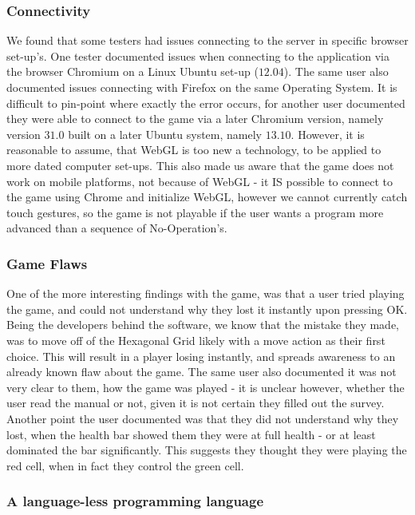\subsubsection{Connectivity}

We found that some testers had issues connecting to the server in specific browser set-up's. One tester documented issues when connecting to the application via the browser Chromium on a Linux Ubuntu set-up ($12.04$). The same user also documented issues connecting with Firefox on the same Operating System. It is difficult to pin-point where exactly the error occurs, for another user documented they were able to connect to the game via a later Chromium version, namely version $31.0$ built on a later Ubuntu system, namely $13.10$. However, it is reasonable to assume, that WebGL is too new a technology, to be applied to more dated computer set-ups. This also made us aware that the game does not work on mobile platforms, not because of WebGL - it IS possible to connect to the game using Chrome and initialize WebGL, however we cannot currently catch touch gestures, so the game is not playable if the user wants a program more advanced than a sequence of No-Operation's.

\subsubsection{Game Flaws}

One of the more interesting findings with the game, was that a user tried playing the game, and could not understand why they lost it instantly upon pressing OK. Being the developers behind the software, we know that the mistake they made, was to move off of the Hexagonal Grid likely with a move action as their first choice. This will result in a player losing instantly, and spreads awareness to an already known flaw about the game. The same user also documented it was not very clear to them, how the game was played - it is unclear however, whether the user read the manual or not, given it is not certain they filled out the survey. Another point the user documented was that they did not understand why they lost, when the health bar showed them they were at full health - or at least dominated the bar significantly. This suggests they thought they were playing the red cell, when in fact they control the green cell.

\subsubsection{A language-less programming language}

